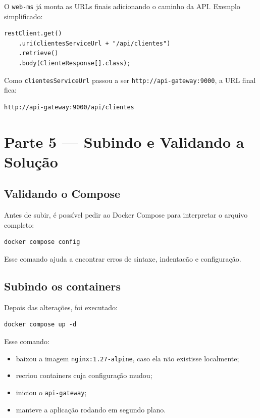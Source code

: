 \documentclass[12pt,a4paper]{article}
\begin{document}
O \texttt{web-ms} j\'a monta as URLs finais adicionando o caminho da API. Exemplo simplificado:

\begin{lstlisting}[style=code]
restClient.get()
    .uri(clientesServiceUrl + "/api/clientes")
    .retrieve()
    .body(ClienteResponse[].class);
\end{lstlisting}

Como \texttt{clientesServiceUrl} passou a ser \texttt{http://api-gateway:9000}, a URL final fica:

\begin{lstlisting}[style=terminal]
http://api-gateway:9000/api/clientes
\end{lstlisting}

\section{Parte 5 --- Subindo e Validando a Solu\c{c}\~ao}

\subsection{Validando o Compose}

Antes de subir, \'e poss\'ivel pedir ao Docker Compose para interpretar o arquivo completo:

\begin{lstlisting}[style=terminal]
docker compose config
\end{lstlisting}

Esse comando ajuda a encontrar erros de sintaxe, indentac\~ao e configura\c{c}\~ao.


\subsection{Subindo os containers}

Depois das altera\c{c}\~oes, foi executado:

\begin{lstlisting}[style=terminal]
docker compose up -d
\end{lstlisting}

Esse comando:

\begin{itemize}[leftmargin=1.5em]
  \item baixou a imagem \texttt{nginx:1.27-alpine}, caso ela n\~ao existisse localmente;
  \item recriou containers cuja configura\c{c}\~ao mudou;
  \item iniciou o \texttt{api-gateway};
  \item manteve a aplica\c{c}\~ao rodando em segundo plano.
\end{itemize}
\end{document}
